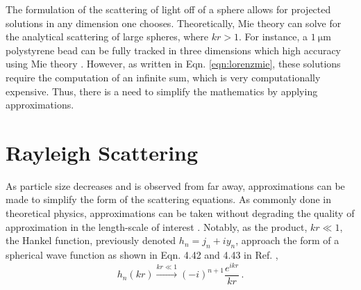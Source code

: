 The formulation of the scattering of light off of a sphere allows for projected solutions in any dimension one chooses. Theoretically, Mie theory can solve for the analytical scattering of large spheres, where $kr > 1$. For instance, a $\SI{1}{\micro \meter}$ polystyrene bead can be fully tracked in three dimensions which high accuracy using Mie theory \cite{leeCharacterizingTrackingSingle2007,Dastjerdi2022, lindfors2004PRL}. However, as written in Eqn. \ref{eqn:lorenzmie}, these solutions require the computation of an infinite sum, which is very computationally expensive. Thus, there is a need to simplify the mathematics by applying approximations. 

\clearpage
\section{Rayleigh Scattering}

As particle size decreases and is observed from far away, approximations can be made to simplify the form of the scattering equations. As commonly done in theoretical physics, approximations can be taken without degrading the quality of approximation in the length-scale of interest \cite{jackson_classical_1999, zangwill2013modern}. Notably, as the product, $kr \ll 1$, the Hankel function, previously denoted $h_n = j_n + iy_n$, approach the form of a spherical wave function as shown in Eqn. 4.42 and 4.43 in Ref. \cite{bohren1983absorption},
\begin{equation}
    h_n(kr) \xrightarrow{kr \ll 1} (-i)^{n+1}\frac{e^{ikr}}{kr}\,.
\end{equation}  


